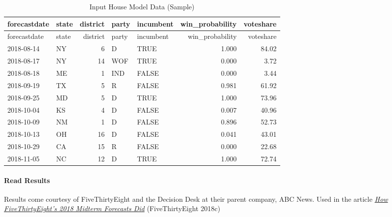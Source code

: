 \documentclass[]{article}
\let\oldparagraph\paragraph
\renewcommand{\paragraph}[1]{\oldparagraph{#1}\mbox{}}
\begin{document}
\begin{longtable}[]{@{}llrllrr@{}}
\caption{Input House Model Data (Sample)}\tabularnewline
\toprule
forecastdate & state & district & party & incumbent & win\_probability &
voteshare\tabularnewline
\midrule
\endfirsthead
\toprule
forecastdate & state & district & party & incumbent & win\_probability &
voteshare\tabularnewline
\midrule
\endhead
2018-08-14 & NY & 6 & D & TRUE & 1.000 & 84.02\tabularnewline
2018-08-17 & NY & 14 & WOF & TRUE & 0.000 & 3.72\tabularnewline
2018-08-18 & ME & 1 & IND & FALSE & 0.000 & 3.44\tabularnewline
2018-09-19 & TX & 5 & R & FALSE & 0.981 & 61.92\tabularnewline
2018-09-25 & MD & 5 & D & TRUE & 1.000 & 73.96\tabularnewline
2018-10-04 & KS & 4 & D & FALSE & 0.007 & 40.96\tabularnewline
2018-10-09 & NM & 1 & D & FALSE & 0.896 & 52.73\tabularnewline
2018-10-13 & OH & 16 & D & FALSE & 0.041 & 43.01\tabularnewline
2018-10-29 & CA & 15 & R & FALSE & 0.000 & 22.68\tabularnewline
2018-11-05 & NC & 12 & D & TRUE & 1.000 & 72.74\tabularnewline
\bottomrule
\end{longtable}

\hypertarget{read-results}{%
\paragraph{Read Results}\label{read-results}}

Results come courtesy of FiveThirtyEight and the Decision Desk at their
parent company, ABC News. Used in the article
\href{https://53eig.ht/2PiFb0f}{\emph{How FiveThirtyEight's 2018 Midterm
Forecasts Did}} (FiveThirtyEight 2018c)
\end{document}
